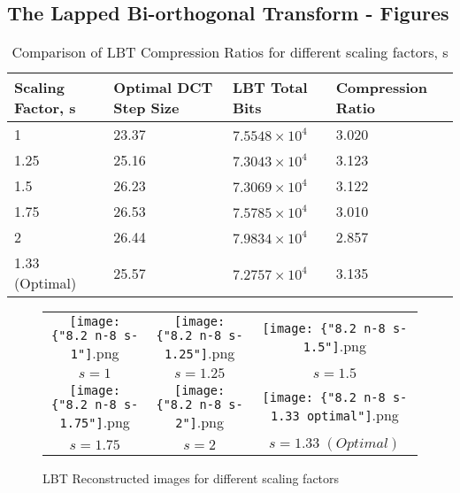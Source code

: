 \documentclass{article}					%
\begin{document}
\begin{appendices}
\section{The Lapped Bi-orthogonal Transform - Figures}

\begin{table}[h!]
\begin{tabular}{|l|l|l|l|}
\hline
\textbf{Scaling Factor, s} & \textbf{Optimal DCT Step Size} & \textbf{LBT Total Bits} & \textbf{Compression Ratio} \\ \hline
1                          & 23.37                          & $7.5548\times 10^4$     & 3.020                      \\ \hline
1.25                       & 25.16                          & $7.3043\times 10^4$     & 3.123                      \\ \hline
1.5                        & 26.23                          & $7.3069\times 10^4$     & 3.122                      \\ \hline
1.75                       & 26.53                          & $7.5785\times 10^4$     & 3.010                      \\ \hline
2                          & 26.44                          & $7.9834\times 10^4$     & 2.857                      \\ \hline
\rowcolor[HTML]{C0C0C0}
1.33 (Optimal)             & 25.57                          & $7.2757\times 10^4$     & 3.135                      \\ \hline
\end{tabular}
\caption{Comparison of LBT Compression Ratios for different scaling factors, s}
\end{table}

\begin{figure}[h!]
\begin{centering}
\begin{tabular}{c c c}
  \texttt{[image: \{"8.2 n-8 s-1"]}.png} & \texttt{[image: \{"8.2 n-8 s-1.25"]}.png} & \texttt{[image: \{"8.2 n-8 s-1.5"]}.png} \\
  $s=1$ & $s=1.25$ & $s=1.5$\\
  \texttt{[image: \{"8.2 n-8 s-1.75"]}.png} & \texttt{[image: \{"8.2 n-8 s-2"]}.png} & \texttt{[image: \{"8.2 n-8 s-1.33 optimal"]}.png} \\
  $s=1.75$ & $s=2$ & $s=1.33 \; (Optimal)$\\
\end{tabular}
\caption{LBT Reconstructed images for different scaling factors}
\end{centering}
\end{figure}


\end{appendices}
\end{document}
